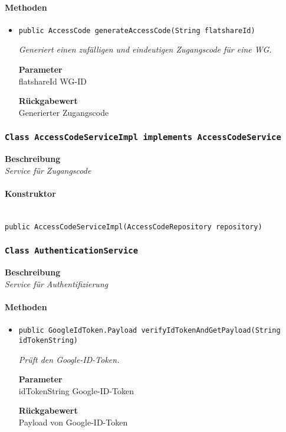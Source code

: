     \paragraph*{Methoden}
    \begin{itemize}
    	\item{\texttt{public AccessCode generateAccessCode(String flatshareId)}}
    	
    	\textit{Generiert einen zufälligen und eindeutigen Zugangscode für eine WG.}
    	
    	\textbf{Parameter} \\
    	flatshareId WG-ID
    	
    	\textbf{Rückgabewert} \\
    	Generierter Zugangscode
    \end{itemize}
    \subsubsection{\texttt{Class AccessCodeServiceImpl implements AccessCodeService}}
    \textbf{Beschreibung} \\
    \textit{Service für Zugangscode}
    \paragraph*{Konstruktor}\mbox{} \\
    \texttt{public AccessCodeServiceImpl(AccessCodeRepository repository)} \\
    \subsubsection{\texttt{Class AuthenticationService}}
    \textbf{Beschreibung} \\
    \textit{Service für Authentifizierung}
    \paragraph*{Methoden}
    \begin{itemize}
    	\item{\texttt{public GoogleIdToken.Payload verifyIdTokenAndGetPayload(String idTokenString)}}
    	
    	\textit{Prüft den Google-ID-Token.}
    	
    	\textbf{Parameter} \\
    	idTokenString Google-ID-Token
    	
    	\textbf{Rückgabewert} \\
    	Payload von Google-ID-Token
    \end{itemize}
